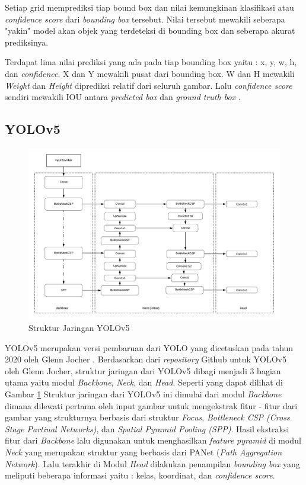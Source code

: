 \par Setiap grid memprediksi tiap bound box dan nilai kemungkinan klasifikasi atau \emph{confidence score} dari \emph{bounding box} tersebut.
Nilai tersebut mewakili seberapa "yakin" model akan objek yang terdeteksi di bounding box dan seberapa akurat
prediksinya. 

\par Terdapat lima nilai prediksi yang ada pada tiap bounding box yaitu : x, y, w, h, dan \emph{confidence}.
X dan Y mewakili pusat dari bounding box. W dan H mewakili \emph{Weight} dan \emph{Height} diprediksi relatif
dari seluruh gambar. Lalu \emph{confidence score} sendiri mewakili IOU antara \emph{predicted box} dan \emph{ground truth box} \cite{redmon2016you}.

\subsection{YOLOv5}
\label{subsec:yolov5}

\begin{figure}[ht]
    \centering
    \includegraphics[scale=0.5]{gambar/yolov5 structure.png}
    \caption{Struktur Jaringan YOLOv5}
    \label{fig:yolov5network}  
\end{figure}

\par YOLOv5 merupakan versi pembaruan dari YOLO yang dicetuskan pada tahun 2020 oleh Glenn Jocher \cite{glenn_jocher_yolov5}. Berdasarkan dari \emph{repository} Github untuk YOLOv5 oleh Glenn Jocher, struktur jaringan dari YOLOv5 dibagi menjadi 3 bagian utama yaitu modul \emph{Backbone}, \emph{Neck}, dan \emph{Head}.
Seperti yang dapat dilihat di Gambar \ref{fig:yolov5network} Struktur jaringan dari YOLOv5 ini dimulai dari modul \emph{Backbone} dimana dilewati pertama oleh input gambar untuk mengekstrak fitur - fitur dari gambar yang strukturnya berbasis dari struktur \emph{Focus}, \emph{Bottleneck CSP (Cross Stage Partinal Networks)}, dan \emph{Spatial Pyramid Pooling (SPP)}.
Hasil ekstraksi fitur dari \emph{Backbone} lalu digunakan untuk menghasilkan \emph{feature pyramid} di modul \emph{Neck} yang merupakan struktur yang berbasis dari PANet (\emph{Path Aggregation Network}).
Lalu terakhir di Modul \emph{Head} dilakukan penampilan \emph{bounding box} yang meliputi beberapa informasi yaitu : kelas, koordinat, dan \emph{confidence score}.
